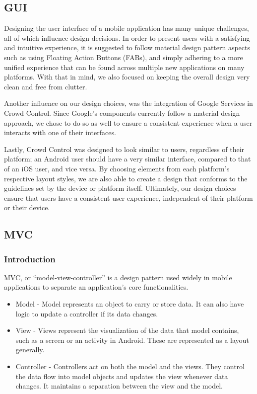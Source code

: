  \subsection{GUI}
 Designing the user interface of a mobile application has many unique challenges, all of which influence design decisions. In order to present users with a satisfying and intuitive experience, it is suggested to follow material design pattern aspects such as using Floating Action Buttons (FABs), and simply adhering to a more unified experience that can be found across multiple new applications on many platforms. With that in mind, we also focused on keeping the overall design very clean and free from clutter.
 
 Another influence on our design choices, was the integration of Google Services in Crowd Control. Since Google's components currently follow a material design approach, we chose to do so as well to ensure a consistent experience when a user interacts with one of their interfaces.
 
 Lastly, Crowd Control was designed to look similar to users, regardless of their platform; an Android user should have a very similar interface, compared to that of an iOS user, and vice versa. By choosing elements from each platform's respective layout styles, we are also able to create a design that conforms to the guidelines set by the device or platform itself. Ultimately, our design choices ensure that users have a consistent user experience, independent of their platform or their device.
 
 \subsection{MVC}
 
 \subsubsection{Introduction}
 MVC, or ``model-view-controller'' is a design pattern used widely in mobile applications to separate an application's core functionalities. \begin{itemize}
  \item Model - Model represents an object to carry or store data. It can also have logic to update a controller if its data changes.
  \item View - Views represent the visualization of the data that model contains, such as a screen or an activity in Android. These are represented as a layout generally.
  \item Controller - Controllers act on both the model and the views. They control the data flow into model objects and updates the view whenever data changes. It maintains a separation between the view and the model.
\end{itemize}
 
